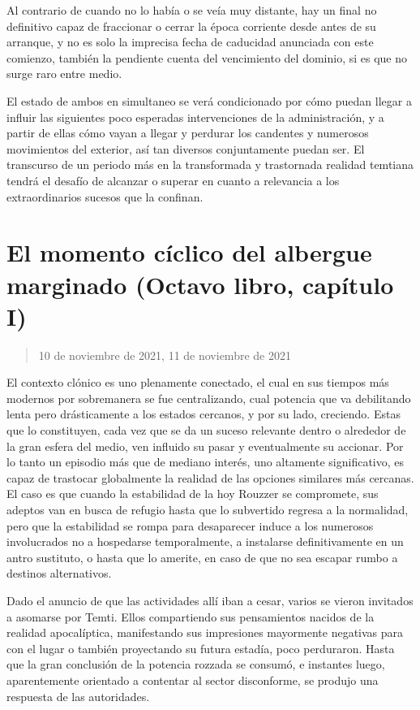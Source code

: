 \documentclass[
]{book}
\begin{document}
Al contrario de cuando no lo había o se veía muy distante, hay un final no definitivo capaz de fraccionar o cerrar la época corriente desde antes de su arranque, y no es solo la imprecisa fecha de caducidad anunciada con este comienzo, también la pendiente cuenta del vencimiento del dominio, si es que no surge raro entre medio.

El estado de ambos en simultaneo se verá condicionado por cómo puedan llegar a influir las siguientes poco esperadas intervenciones de la administración, y a partir de ellas cómo vayan a llegar y perdurar los candentes y numerosos movimientos del exterior, así tan diversos conjuntamente puedan ser. El transcurso de un periodo más en la transformada y trastornada realidad temtiana tendrá el desafío de alcanzar o superar en cuanto a relevancia a los extraordinarios sucesos que la confinan.

\hypertarget{el-momento-cuxedclico-del-albergue-marginado-octavo-libro-capuxedtulo-i}{%
\section{El momento cíclico del albergue marginado (Octavo libro, capítulo I)}\label{el-momento-cuxedclico-del-albergue-marginado-octavo-libro-capuxedtulo-i}}

\begin{quote}
10 de noviembre de 2021, 11 de noviembre de 2021
\end{quote}

El contexto clónico es uno plenamente conectado, el cual en sus tiempos más modernos por sobremanera se fue centralizando, cual potencia que va debilitando lenta pero drásticamente a los estados cercanos, y por su lado, creciendo. Estas que lo constituyen, cada vez que se da un suceso relevante dentro o alrededor de la gran esfera del medio, ven influido su pasar y eventualmente su accionar. Por lo tanto un episodio más que de mediano interés, uno altamente significativo, es capaz de trastocar globalmente la realidad de las opciones similares más cercanas. El caso es que cuando la estabilidad de la hoy Rouzzer se compromete, sus adeptos van en busca de refugio hasta que lo subvertido regresa a la normalidad, pero que la estabilidad se rompa para desaparecer induce a los numerosos involucrados no a hospedarse temporalmente, a instalarse definitivamente en un antro sustituto, o hasta que lo amerite, en caso de que no sea escapar rumbo a destinos alternativos.

Dado el anuncio de que las actividades allí iban a cesar, varios se vieron invitados a asomarse por Temti. Ellos compartiendo sus pensamientos nacidos de la realidad apocalíptica, manifestando sus impresiones mayormente negativas para con el lugar o también proyectando su futura estadía, poco perduraron. Hasta que la gran conclusión de la potencia rozzada se consumó, e instantes luego, aparentemente orientado a contentar al sector disconforme, se produjo una respuesta de las autoridades.
\end{document}
